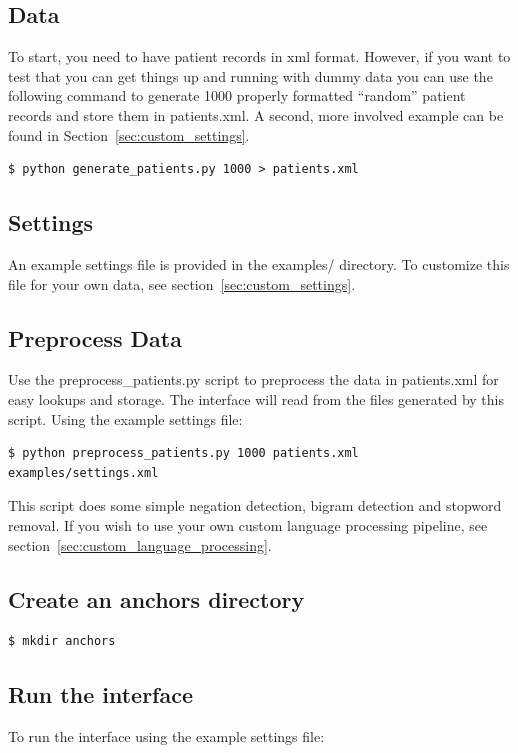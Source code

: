 \documentclass[12pt]{article}
\begin{document}
\subsection{Data}
To start, you need to have patient records in xml format. 
However, if you want to test that you can get things up and running with dummy data you can use the following command to generate 1000 properly formatted ``random'' patient records and store them in patients.xml.
A second, more involved example can be found in Section~\ref{sec:custom_settings}.

\begin{verbatim}
$ python generate_patients.py 1000 > patients.xml
\end{verbatim}

\subsection{Settings}
An example settings file is provided in the examples/ directory. To customize this file for your own data, see section~\ref{sec:custom_settings}.

\subsection{Preprocess Data}

Use the preprocess\_patients.py script to preprocess the data in patients.xml for easy lookups and storage. The interface will read from the files generated by this script. Using the example settings file:

\begin{verbatim}
$ python preprocess_patients.py 1000 patients.xml examples/settings.xml
\end{verbatim}

This script does some simple negation detection, bigram detection and stopword removal.
If you wish to use your own custom language processing pipeline, see section~\ref{sec:custom_language_processing}.

\subsection{Create an anchors directory}
\begin{verbatim}
$ mkdir anchors
\end{verbatim}

\subsection{Run the interface}
To run the interface using the example settings file:
\end{document}
